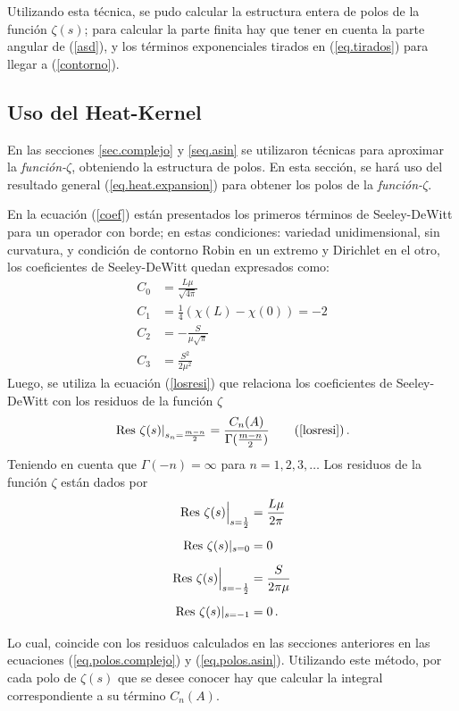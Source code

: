 Utilizando esta técnica, se pudo calcular la estructura entera de polos de la función $\zeta (s)$; para calcular la parte finita hay que tener en cuenta la parte angular de (\ref{asd}), y los términos exponenciales tirados en (\ref{eq.tirados}) para llegar a (\ref{contorno}).


\subsection{Uso del Heat-Kernel}

En las secciones \ref{sec.complejo} y \ref{seq.asin} se utilizaron técnicas para aproximar la {\it función-$\zeta$}, obteniendo la estructura de polos. En esta sección, se hará uso del resultado general (\ref{eq.heat.expansion}) para obtener los polos de la {\it función-$\zeta$}.

En la ecuación (\ref{coef}) están presentados los primeros términos de Seeley-DeWitt para un operador con borde; en estas condiciones: variedad unidimensional, sin curvatura, y condición de contorno Robin en un extremo y Dirichlet en el otro, los coeficientes de Seeley-DeWitt quedan expresados como:
\begin{equation}
\begin{aligned}
C _0 &=  \frac{L \mu}{\sqrt{4 \pi} }\\
C _1 &=  \frac{1}{4} \left( \chi (L) - \chi (0) \right) =  -2 \\
C _2 &= - \frac{S}{\mu \sqrt{\pi} } \\
C _3 &= \frac{ S ^2 }{2 \mu ^2 }
\end{aligned}
\end{equation}
Luego, se utiliza la ecuación (\ref{losresi}) que relaciona los coeficientes de Seeley-DeWitt con los residuos de la función $\zeta$
\begin{equation}
\left. {\rm Res} \ \zeta  (s)  \right| _{s_n= \frac{m - n}{2}} =  
\frac{ C_n  (A) }{ {\Gamma ( \frac{m-n}{2}} ) }
\tag{\ref{losresi}}
\, .
\end{equation}
Teniendo en cuenta que $\Gamma (-n) = \infty$ para $n = 1,2,3, \dots  $ Los residuos de la función $\zeta$ están dados por
\begin{equation}
\begin{aligned}
{\rm Res} \  \zeta  (s)  \Big| _{s=\frac{1}{2}} &= \frac{L \mu}{2 \pi} \\[5pt]
{\rm Res} \  \zeta  (s)  | _{s=0} &= 0 \\[5pt]
{\rm Res} \ \zeta (s) \Big| _{s= - \frac{1}{2}} &= \frac{S}{2 \pi \mu} \\[5pt]
{\rm Res} \  \zeta  (s) | _{s=-1} &= 0 \, . \\[5pt]
\end{aligned}
\end{equation}
Lo cual, coincide con los residuos calculados en las secciones anteriores en las ecuaciones (\ref{eq.polos.complejo}) y (\ref{eq.polos.asin}). Utilizando este método, por cada polo de $\zeta (s)$ que se desee conocer hay que calcular la integral correspondiente a su término $C _n (A)$.

